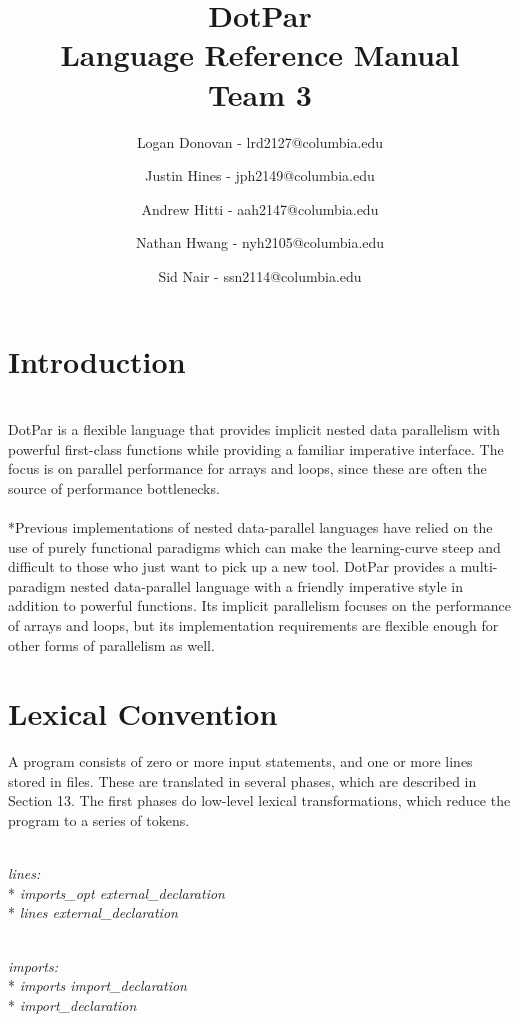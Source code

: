 \documentclass[11pt]{article}
\newcommand{\tab}{\hspace*{2em}}
\begin{document}
\title{DotPar \\ Language Reference Manual \\ Team 3}
\author{
Logan Donovan - lrd2127@columbia.edu \and
Justin Hines - jph2149@columbia.edu \and
Andrew Hitti - aah2147@columbia.edu \and
Nathan Hwang - nyh2105@columbia.edu \and
Sid Nair - ssn2114@columbia.edu}
\maketitle

\section{Introduction}
\\DotPar is a flexible language that provides implicit nested data parallelism with powerful first-class functions while providing a familiar imperative interface. The focus is on parallel performance for arrays and loops, since these are often the source of performance bottlenecks.
\\ \\*Previous implementations of nested data-parallel languages have relied on the use of purely functional paradigms which can make the learning-curve steep and difficult to those who just want to pick up a new tool. DotPar provides a multi-paradigm nested data-parallel language with a friendly imperative style in addition to powerful functions. Its implicit parallelism focuses on the performance of arrays and loops, but its implementation requirements are flexible enough for other forms of parallelism as well.

\section{Lexical Convention}
A program consists of zero or more input statements, and one or more lines stored in files. These are translated in several phases, which are described in Section 13. The first phases do low-level lexical transformations, which reduce the program to a series of tokens.

\\ \tab \emph{lines:} 
\\* \tab \tab \tab \textit{imports\_opt external\_declaration}
\\* \tab \tab \tab \emph{lines external\_declaration}

\\ \tab \emph{imports:}
\\* \tab \tab \tab \textit{imports import\_declaration}
\\* \tab \tab \tab \textit{import\_declaration}
\end{document}
